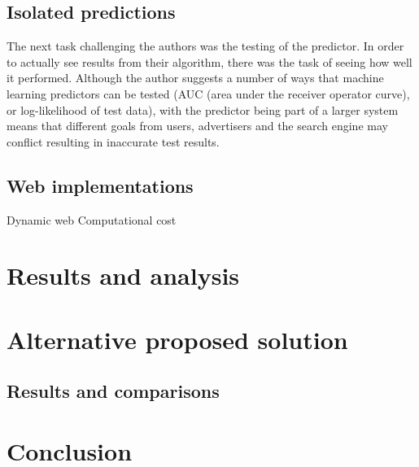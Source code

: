 \documentclass[journal]{IEEEtran}
\begin{document}
\subsection{Isolated predictions}
The next task challenging the authors was the testing of the predictor. In order to actually see results from their algorithm, there was the task of seeing how well it performed. Although the author suggests a number of ways that machine learning predictors can be tested (AUC (area under the receiver operator curve), or log-likelihood of test data), with the predictor being part of a larger system means that different goals from users, advertisers and the search engine may conflict resulting in inaccurate test results.

\subsection{Web implementations}
Dynamic web
Computational cost

\section{Results and analysis}

\section{Alternative proposed solution}

\subsection{Results and comparisons}

\section{Conclusion}

\appendices

\ifCLASSOPTIONcaptionsoff
  \newpage
\fi
\end{document}
